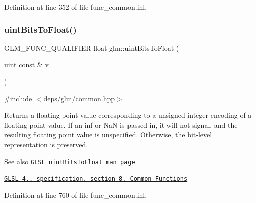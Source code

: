 Definition at line 352 of file func\+\_\+common.\+inl.

\mbox{\label{group__core__func__common_ga97464ca9ff4267de30ea408f700d4ca8}} 
\subsubsection{\texorpdfstring{uint\+Bits\+To\+Float()}{uintBitsToFloat()}\hspace{0.1cm}{\footnotesize\ttfamily [1/2]}}
{\footnotesize\ttfamily G\+L\+M\+\_\+\+F\+U\+N\+C\+\_\+\+Q\+U\+A\+L\+I\+F\+I\+ER float glm\+::uint\+Bits\+To\+Float (\begin{DoxyParamCaption}\item[{\hyperlink{group__core__precision_ga4fd29415871152bfb5abd588334147c8}{uint} const \&}]{v }\end{DoxyParamCaption})}



{\ttfamily \#include $<$\hyperlink{common_8hpp}{deps/glm/common.\+hpp}$>$}

Returns a floating-\/point value corresponding to a unsigned integer encoding of a floating-\/point value. If an inf or NaN is passed in, it will not signal, and the resulting floating point value is unspecified. Otherwise, the bit-\/level representation is preserved.

\begin{DoxySeeAlso}{See also}
\href{http://www.opengl.org/sdk/docs/manglsl/xhtml/uintBitsToFloat.xml}{\tt G\+L\+SL uint\+Bits\+To\+Float man page} 

\href{http://www.opengl.org/registry/doc/GLSLangSpec.4.20.8.pdf}{\tt G\+L\+SL 4.. specification, section 8. Common Functions} 
\end{DoxySeeAlso}


Definition at line 760 of file func\+\_\+common.\+inl.

\mbox{\label{group__core__func__common_ga97f46b5f7b42fe44482e13356eb394ae}} 

